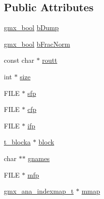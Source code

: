 \subsection*{\-Public \-Attributes}
\begin{DoxyCompactItemize}
\item 
\hyperlink{include_2types_2simple_8h_a8fddad319f226e856400d190198d5151}{gmx\-\_\-bool} \hyperlink{structt__dsdata_add04f207599c288bcea27eb151d885bd}{b\-Dump}
\item 
\hyperlink{include_2types_2simple_8h_a8fddad319f226e856400d190198d5151}{gmx\-\_\-bool} \hyperlink{structt__dsdata_ad8400dfd91bac4fae30492e9b1a06284}{b\-Frac\-Norm}
\item 
const char $\ast$ \hyperlink{structt__dsdata_a722adf8e1c69fa2770f1f00b6a61c688}{routt}
\item 
int $\ast$ \hyperlink{structt__dsdata_aae4b299a9c50d30992c68111d4d9381d}{size}
\item 
\-F\-I\-L\-E $\ast$ \hyperlink{structt__dsdata_ae583f262d79fe69e4953ef5200c3d758}{sfp}
\item 
\-F\-I\-L\-E $\ast$ \hyperlink{structt__dsdata_ad71462680cde1d2043c83d872c077d7d}{cfp}
\item 
\-F\-I\-L\-E $\ast$ \hyperlink{structt__dsdata_a461003af56657bda8b781330e58acd09}{ifp}
\item 
\hyperlink{structt__blocka}{t\-\_\-blocka} $\ast$ \hyperlink{structt__dsdata_a2952ae20c5addc05683a1add7cb0661e}{block}
\item 
char $\ast$$\ast$ \hyperlink{structt__dsdata_a3c008052983521c857c1c1cc1d46ed41}{gnames}
\item 
\-F\-I\-L\-E $\ast$ \hyperlink{structt__dsdata_a03ea565cc1c7a9c61f9eae13142f798a}{mfp}
\item 
\hyperlink{structgmx__ana__indexmap__t}{gmx\-\_\-ana\-\_\-indexmap\-\_\-t} $\ast$ \hyperlink{structt__dsdata_a9cfb422bf722fa2bcfbc8993dc9cf1c2}{mmap}
\end{DoxyCompactItemize}


